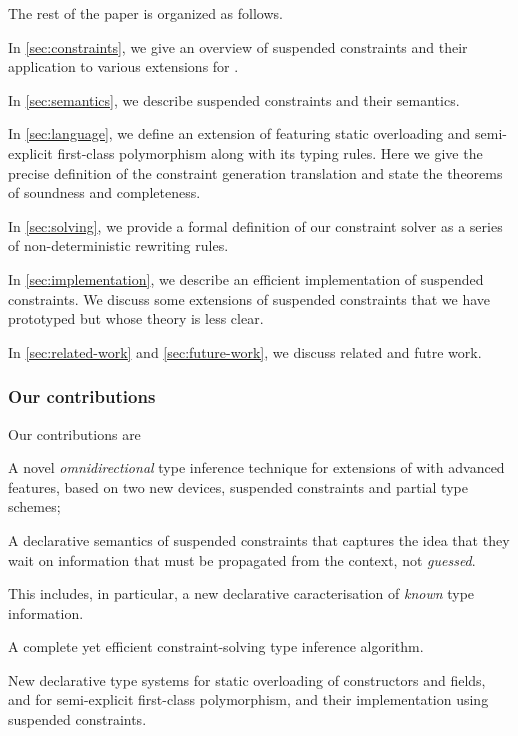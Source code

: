 \documentclass[acmsmall,screen,nonacm]{acmart}
\begin{document}
The rest of the paper is organized as follows.
\begin{enumerate*}[label={}]
\item
  In \cref{sec:constraints}, we give an overview of suspended constraints
  and their application to various extensions for \ML.
\item
  In \cref{sec:semantics}, we describe suspended constraints and their semantics.
\item
  In \cref{sec:language}, we define an extension of \ML featuring static
  overloading and semi-explicit first-class polymorphism along with its
  typing rules. Here we give the precise definition of the constraint
  generation translation and state the theorems of soundness and
  completeness.
\item
  In \cref{sec:solving}, we provide a formal definition of our constraint
  solver as a series of non-deterministic rewriting rules.
\item In \cref{sec:implementation}, we describe an efficient implementation
  of suspended constraints. We discuss some extensions of suspended
  constraints that we have prototyped but whose theory is less clear.
\item
  In \cref{sec:related-work} and \cref{sec:future-work}, we discuss related
  and futre work.
\end{enumerate*}


\subsubsection* {Our contributions}

Our contributions are
\begin{enumerate*}
\item
  A novel \emph{omnidirectional} type inference technique for
  extensions of \ML with advanced features, based on two new devices,
  suspended constraints and partial type schemes;

\item A declarative semantics of suspended constraints that captures the
  idea that they wait on information that must be propagated from the
  context, not \emph{guessed}.

  This includes, in particular, a new declarative caracterisation of
  \emph{known} type information.

\item
  A complete yet efficient constraint-solving type inference algorithm.

\item New declarative type systems for static overloading of constructors
  and fields, and for semi-explicit first-class polymorphism, and their
  implementation using suspended constraints.
\end{enumerate*}
\end{document}
